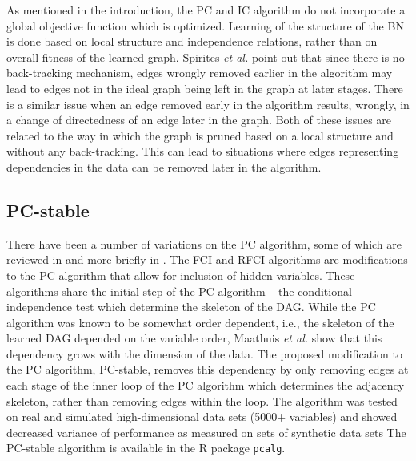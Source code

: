     As mentioned in the introduction, the PC and IC 
    algorithm do not incorporate a global objective function
    which is optimized. Learning of the structure of the 
    BN is done based on local structure and independence
    relations, rather than on overall fitness of the learned
    graph. Spirites \textit{et al.} point out that since there is no 
    back-tracking mechanism, edges wrongly removed earlier
    in the algorithm may lead to edges not in the 
    ideal graph being left in the graph at later stages. 
    There is a similar issue when an edge 
    removed early in the algorithm results, wrongly, 
    in a change of 
    directedness of an edge later in the graph. Both of these issues are 
    related to the way in which the graph is pruned 
    based on a local structure and without any back-tracking. 
    This can lead to situations where
    edges representing dependencies in the data can 
    be removed later in the algorithm.  




     \subsection{PC-stable}

     There have been a number of variations on the PC algorithm, 
     some of which are reviewed in \cite{Colombo2014} and
     more briefly in \cite{Maathuis2015}. The FCI and RFCI algorithms are
     modifications to the PC algorithm that allow for inclusion
     of hidden variables. These algorithms share the initial
     step of the PC algorithm -- the conditional independence test
     which determine the skeleton of the DAG. While the PC algorithm
     was known to be somewhat order dependent, i.e., the skeleton of the
     learned DAG depended on the variable order, Maathuis 
      \textit{et al.} show that
     this dependency grows with the dimension of the data. The proposed
     modification to the PC algorithm, PC-stable, removes this dependency
     by only removing edges at each stage of the inner loop of the
     PC algorithm which determines the adjacency skeleton, 
     rather than removing edges within the loop. The algorithm was tested
     on real and simulated high-dimensional data sets (5000+ variables)
     and showed decreased variance of performance as measured on 
     sets of synthetic data sets 
     \cite{Colombo2014} The PC-stable algorithm is available in the R package
     \texttt{pcalg}.

